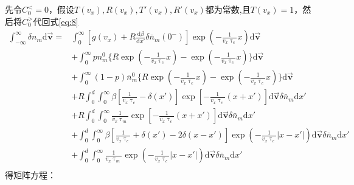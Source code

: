 \documentclass{article}
\begin{document}
	先令$C_0^<=0$，假设$T(v_x),R(v_x),T'(v_x),R'(v_x)$都为常数,且$T(v_x)=1$，然后将$C_0^>$代回式\eqref{eq:8}
	\begin{equation}\label{eq:12}
		\begin{aligned}
			\int_{-\infty}^{\infty}\delta n_m\mathrm{d}\vec{\textbf{v}}=&\int_0^\infty [g(v_x)+R\frac{\mathrm{d}\beta}{\mathrm{d}x'}\delta\bar{n}_m(0^-)]\exp(-\frac{1}{v_x\uptau_c}x)\mathrm{d}\vec{\textbf{v}}\\
			&+\int_0^\infty pn^0_m\{R\exp(-\frac{1}{v_x\uptau_c}x)-\exp(-\frac{1}{v_x\uptau_c}x)\}\mathrm{d}\vec{\textbf{v}}\\
			&+\int_0^\infty (1-p)\bar{n}^0_m\{R\exp(-\frac{1}{v_x\uptau_c}x)-\exp(-\frac{1}{v_x\uptau_c}x)\}\mathrm{d}\vec{\textbf{v}}\\
			&+R\int_0^d\int_0^\infty\beta[\frac{1}{v_x\uptau_c}-\delta(x')]\exp[-\frac{1}{v_x\uptau_{c}}(x+x')]\mathrm{d}\vec{\textbf{v}}\delta\bar{n}_m\mathrm{d}x'\\
			&+R\int_0^d\int_0^\infty\frac{1}{v_x\uptau_m}\exp[-\frac{1}{v_x\uptau_{c}}(x+x')]\mathrm{d}\vec{\textbf{v}}\delta\bar{n}_m\mathrm{d}x'\\
			&+\int_0^d\int_0^\infty\beta[\frac{1}{v_x\uptau_c}+\delta(x')-2\delta(x-x')]\exp(-\frac{1}{v_x\uptau_{c}}|x-x'|)\mathrm{d}\vec{\textbf{v}}\delta\bar{n}_m\mathrm{d}x'\\
			&+\int_0^d\int_0^\infty\frac{1}{v_x\uptau_m}\exp(-\frac{1}{v_x\uptau_{c}}|x-x'|)\mathrm{d}\vec{\textbf{v}}\delta\bar{n}_m\mathrm{d}x'\\
		\end{aligned}
		\end{equation}
得矩阵方程：
\end{document}
